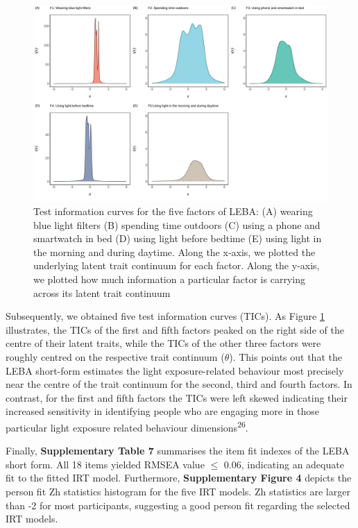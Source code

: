 \documentclass[
  man]{apa6}
\begin{document}
\begin{figure}
\includegraphics[width=1\linewidth,height=1.2\textheight]{Figures/Figure6} \caption{Test information curves for the five factors of LEBA: (A) wearing blue light filters (B) spending time outdoors (C) using a phone and smartwatch in bed (D) using light before bedtime (E) using light in the morning and during daytime. Along the x-axis, we plotted the underlying latent trait continuum for each factor. Along the y-axis, we plotted how much information a particular factor is carrying across its latent trait continuum}\label{fig:Testinfo}
\end{figure}

Subsequently, we obtained five test information curves (TICs). As Figure \ref{fig:Testinfo} illustrates, the TICs of the first and fifth factors peaked on the right side of the centre of their latent traits, while the TICs of the other three factors were roughly centred on the respective trait continuum (\(\theta\)). This points out that the LEBA short-form estimates the light exposure-related behaviour most precisely near the centre of the trait continuum for the second, third and fourth factors. In contrast, for the first and fifth factors the TICs were left skewed indicating their increased sensitivity in identifying people who are engaging more in those particular light exposure related behaviour dimensions\textsuperscript{26}.

Finally, \textbf{Supplementary Table 7} summarises the item fit indexes of the LEBA short form. All 18 items yielded RMSEA value \(\le\) 0.06, indicating an adequate fit to the fitted IRT model. Furthermore, \textbf{Supplementary Figure 4} depicts the person fit Zh statistics histogram for the five IRT models. Zh statistics are larger than -2 for most participants, suggesting a good person fit regarding the selected IRT models.
\end{document}
